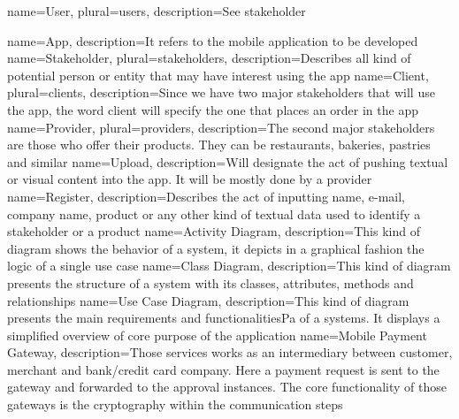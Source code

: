 
 {
    name={User},
    plural={users},
    description={See stakeholder}
}

 {
    name={App},
    description={It refers to the mobile application to be developed}
}
 {
    name={Stakeholder},
    plural={stakeholders},
    description={Describes all kind of potential person or entity that may have interest using the app}
}
 {
    name={Client},
    plural={clients},
    description={Since we have two major stakeholders that will use the app, the word client will
    specify the one that places an order in the app}
}
 {
    name={Provider},
    plural={providers},
    description={The second major stakeholders are those who offer their products. They can be
                restaurants, bakeries, pastries and similar}
}
 {
    name={Upload},
    description={Will designate the act of pushing textual or visual content into the app. It will
                be mostly done by a provider}
}
 {
    name={Register},
    description={Describes the act of inputting name, e-mail, company name, product or any other kind of
    textual data used to identify a stakeholder or a product}
}
 {
    name={Activity Diagram},
    description={This kind of diagram shows the behavior of a system, it depicts in a graphical fashion 
    the logic of a single use case \cite{refinbook:Baresi2009}}
}
 {
    name={Class Diagram},
    description={This kind of diagram presents the structure of a system with its classes, attributes,
    methods and relationships\cite{refonline:IBMCD}}
}
 {
    name={Use Case Diagram},
    description={This kind of diagram presents the main requirements and functionalitiesPa of a systems. It displays
    a simplified overview of core purpose of the application \cite{refart:YWRUS}}
}
 {
    name={Mobile Payment Gateway},
    description={Those services works as an intermediary between customer, merchant and bank/credit card company. 
    Here a payment request is sent to the gateway and forwarded to the approval instances. The core functionality 
    of those gateways is the cryptography within the communication steps\cite{refonline:VPGI}}
}

